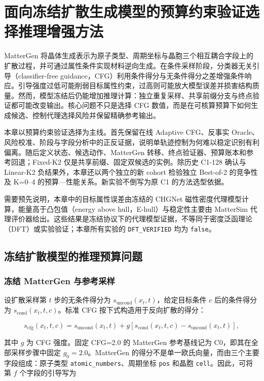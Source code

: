 \chapter{面向冻结扩散生成模型的预算约束验证选择推理增强方法}

MatterGen 将晶体生成表示为原子类型、周期坐标与晶胞三个相互耦合字段上的扩散过程，并可通过属性条件实现材料逆向生成\citep{zeni2025}。在条件采样阶段，分类器无关引导（classifier-free guidance，CFG）利用条件得分与无条件得分之差增强条件响应\citep{ho2022}。引导强度过低可能削弱目标属性约束，过高则可能放大模型误差并损害结构质量。然而，模型冻结后仍能增加推理计算：独立重复采样、共享前缀分支与终点验证都可能改变输出。核心问题不只是选择 CFG 数值，而是在可核算预算下如何生成候选、控制代理选择风险并保留精确参考输出。

本章以预算约束验证选择为主线。首先保留在线 Adaptive CFG、反事实 Oracle、风险校准、阶段与字段分析中的正反证据，说明单轨迹控制为何难以稳定识别有利偏离。随后定义状态、候选动作、MatterGen 转移、终点验证器、预算账本和参考回退；Fixed-K2 仅是共享前缀、固定双候选的实例。除历史 C1-128 确认与 Linear-K2 负结果外，本章还以两个独立的新 cohort 检验独立 Best-of-2 的竞争性及 K=0--4 的预算---性能关系。新实验不倒写为原 C1 的方法选型依据。

需要预先说明，本章中的目标属性误差由冻结的 CHGNet 磁性密度代理模型计算\citep{deng2023}，能量高于凸包值（energy above hull，E-hull）与稳定性主要由 Matter\allowbreak Sim 代理评价器给出\citep{yang2024mattersim}。这些结果是冻结协议下的代理模型证据，不等同于密度泛函理论（DFT）或实验验证；本章所有实验的 \texttt{DFT\_VERIFIED} 均为 \texttt{false}。

\section{冻结扩散模型的推理预算问题}

\subsection{冻结 MatterGen 与参考采样}

设扩散采样第 \(t\) 步的无条件得分为 \(s_{\mathrm{uncond}}(x_t,t)\)，给定目标条件 \(c\) 后的条件得分为 \(s_{\mathrm{cond}}(x_t,t,c)\)。标准 CFG 按下式构造用于反向扩散的得分：

\[
s_{\mathrm{cfg}}(x_t,t,c)
=s_{\mathrm{uncond}}(x_t,t)
+g\left[s_{\mathrm{cond}}(x_t,t,c)-s_{\mathrm{uncond}}(x_t,t)\right],
\]

其中 \(g\) 为 CFG 强度。固定 CFG=2.0 的 MatterGen 参考基线记为 C0，即其在全部采样步骤中固定 \(g_0=2.0\)。MatterGen 的得分不是单一欧氏向量，而由三个主要字段组成：原子类型 \texttt{atomic\_numbers}、周期坐标 \texttt{pos} 和晶胞 \texttt{cell}。因此，可将第 \(f\) 个字段的引导写为

